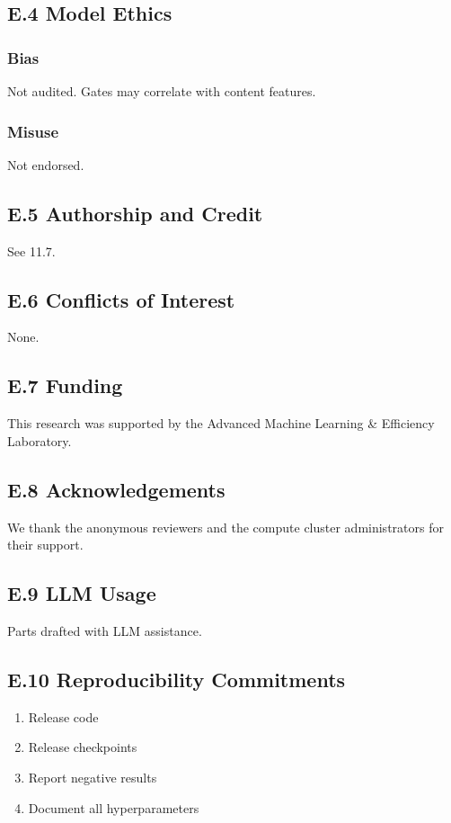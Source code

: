 \subsection{E.4 Model Ethics}

\subsubsection{Bias}
Not audited. Gates may correlate with content features.

\subsubsection{Misuse}
Not endorsed.

\subsection{E.5 Authorship and Credit}

See  11.7.

\subsection{E.6 Conflicts of Interest}

None.

\subsection{E.7 Funding}

This research was supported by the Advanced Machine Learning \& Efficiency Laboratory.

\subsection{E.8 Acknowledgements}

We thank the anonymous reviewers and the compute cluster administrators for their support.

\subsection{E.9 LLM Usage}

Parts drafted with LLM assistance.

\subsection{E.10 Reproducibility Commitments}

\begin{enumerate}
\item Release code
\item Release checkpoints
\item Report negative results
\item Document all hyperparameters

\end{enumerate}
